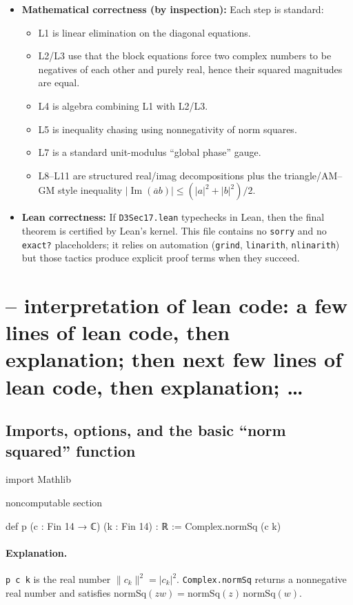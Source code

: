 \documentclass[11pt]{article}
\begin{document}
\begin{itemize}
\item \textbf{Mathematical correctness (by inspection):} Each step is standard:
  \begin{itemize}
  \item L1 is linear elimination on the diagonal equations.
  \item L2/L3 use that the block equations force two complex numbers to be negatives of each other and purely real, hence their squared magnitudes are equal.
  \item L4 is algebra combining L1 with L2/L3.
  \item L5 is inequality chasing using nonnegativity of norm squares.
  \item L7 is a standard unit-modulus ``global phase'' gauge.
  \item L8--L11 are structured real/imag decompositions plus the triangle/AM--GM style inequality $| \operatorname{Im}(\overline{a}b) |\le (|a|^2+|b|^2)/2$.
  \end{itemize}
\item \textbf{Lean correctness:} If \texttt{D3Sec17.lean} typechecks in Lean, then the final theorem is certified by Lean's kernel. This file contains no \texttt{sorry} and no \texttt{exact?} placeholders; it relies on automation (\texttt{grind}, \texttt{linarith}, \texttt{nlinarith}) but those tactics produce explicit proof terms when they succeed.
\end{itemize}

\newpage
\section*{-- interpretation of lean code: a few lines of lean code, then explanation; then next few lines of lean code, then explanation; \dots}

\subsection*{Imports, options, and the basic ``norm squared'' function}

\begin{LeanCode}
import Mathlib

noncomputable section

def p (c : Fin 14 → ℂ) (k : Fin 14) : ℝ := Complex.normSq (c k)
\end{LeanCode}

\paragraph{Explanation.}
\texttt{p c k} is the real number $\|c_k\|^2 = |c_k|^2$.
\texttt{Complex.normSq} returns a nonnegative real number and satisfies $\mathrm{normSq}(zw)=\mathrm{normSq}(z)\,\mathrm{normSq}(w)$.
\end{document}
